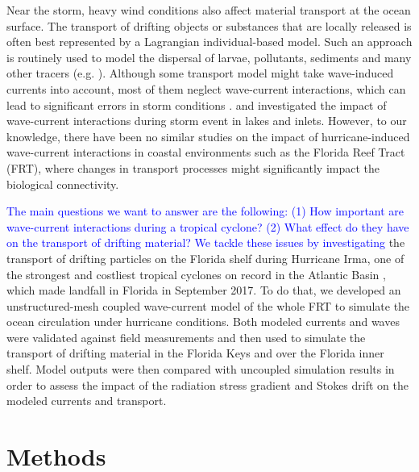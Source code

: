\documentclass[preprint,12pt,authoryear]{elsarticle}
\newcommand{\modif}[1]{\textcolor{blue}{#1}}
\begin{document}
Near the storm, heavy wind conditions also affect material transport at the ocean surface. The transport of drifting objects or substances that are locally released is often best represented by a Lagrangian individual-based model. Such an approach is routinely used to model the dispersal of larvae, pollutants, sediments and many other tracers (e.g. \citealp{le2012surface,liubartseva2018tracking, figueiredo2013synthesizing,frys2020fine}). Although some transport model might take wave-induced currents into account, most of them neglect wave-current interactions, which can lead to significant errors in storm conditions \citep{rohrs2012observation,curcic2016hurricane}. \cite{niu2017role} and \cite{mao2018wave,mao2020particle} investigated the impact of wave-current interactions during storm event in lakes and inlets. However, to our knowledge, there have been no similar studies on the impact of hurricane-induced wave-current interactions in coastal environments such as the Florida Reef Tract (FRT), where changes in transport processes might significantly impact the biological connectivity.

\modif{The main questions we want to answer are the following: (1) How important are wave-current interactions during a tropical cyclone? (2) What effect do they have on the transport of drifting material? We tackle these issues by investigating} the transport of drifting particles on the Florida shelf during Hurricane Irma, one of the strongest and costliest tropical cyclones on record in the Atlantic Basin \citep{xian2018brief}, which made landfall in Florida in September 2017. To do that, we developed an unstructured-mesh coupled wave-current model of the whole FRT to simulate the ocean circulation under hurricane conditions. Both modeled currents and waves were validated against field measurements and then used to simulate the transport of drifting material in the Florida Keys and over the Florida inner shelf. Model outputs were then compared with uncoupled simulation results in order to assess the impact of the radiation stress gradient and Stokes drift on the modeled currents and transport.  

\section{Methods}
\end{document}
